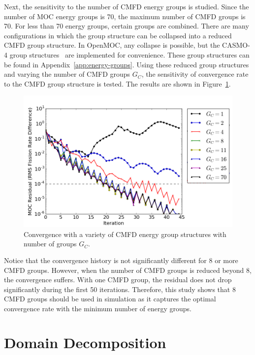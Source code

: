 Next, the sensitivity to the number of \ac{CMFD} energy groups is studied. Since the number of \ac{MOC} energy groups is 70, the maximum number of \ac{CMFD} groups is 70. For less than 70 energy groups, certain groups are combined. There are many configurations in which the group structure can be collapsed into a reduced \ac{CMFD} group structure. In OpenMOC, any collapse is possible, but the CASMO-4 group structures~\cite{edenius1995casmo} are implemented for convenience. These group structures can be found in Appendix~\ref{app:energy-groups}. Using these reduced group structures and varying the number of \ac{CMFD} groups $G_C$, the sensitivity of convergence rate to the \ac{CMFD} group structure is tested. The results are shown in Figure~\ref{fig:cmfd-energy-groups}.

\begin{figure}[h!]
	\centering
	\includegraphics[width=0.9\linewidth]{figures/results/sensitivity/cmfd-groups.png}
	\caption[]{Convergence with a variety of \ac{CMFD} energy group structures with number of groups $G_C$.}
	\label{fig:cmfd-energy-groups}
\end{figure}

Notice that the convergence history is not significantly different for 8 or more \ac{CMFD} groups. However, when the number of \ac{CMFD} groups is reduced beyond 8, the convergence suffers. With one \ac{CMFD} group, the residual does not drop significantly during the first 50 iterations. Therefore, this study shows that 8 \ac{CMFD} groups should be used in simulation as it captures the optimal convergence rate with the minimum number of energy groups.

\section{Domain Decomposition}
\label{sec:domain-decomposition-convergence}

